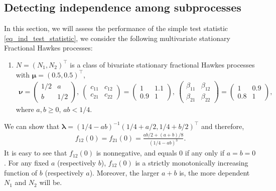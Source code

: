 \documentclass[11pt]{article}
\numberwithin{equation}{section}
\theoremstyle{plain}
\theoremstyle{definition}
\theoremstyle{definition}
\theoremstyle{assumption}
\theoremstyle{proposition}
\theoremstyle{proposition}
\theoremstyle{example}
\theoremstyle{lemma}
\theoremstyle{theorem}
\theoremstyle{remark}
\begin{document}
\subsection{Detecting independence among subprocesses}\label{example_estimation_nu}
In this section, we will assess the performance of the simple test statistic \eqref{eq_ind_test_statistic}, we consider the following multivariate stationary Fractional Hawkes processes:
\begin{enumerate}
 \item[FH6.] $N=(N_1,N_2)^{\top}$ is a class of bivariate stationary fractional Hawkes processes with $\boldsymbol{\mu} = (0.5, 0.5)^{\top}$,
 \begin{align*}
  \boldsymbol{\nu} = 
\begin{pmatrix}
1/2 & a \\
b & 1/2
\end{pmatrix} ,~
\begin{pmatrix}
c_{11} & c_{12} \\
c_{21} & c_{22}
\end{pmatrix} = 
\begin{pmatrix}
1 & 1.1 \\
0.9 & 1
\end{pmatrix} ,~
\begin{pmatrix}
\beta_{11} & \beta_{12} \\
\beta_{21} & \beta_{22}
\end{pmatrix} = 
\begin{pmatrix}
1 & 0.9 \\
0.8 & 1
\end{pmatrix} ,  
 \end{align*}
where $a,b\geqslant0$, $ab<1/4$. 
\end{enumerate}
We can show that $\boldsymbol{\lambda} = (1/4 - ab)^{-1}(1/4 + a/2, 1/4 + b/2)^{\top}$ and therefore,
\begin{align}\label{eq_f12(0)}
f_{12}(0) = f_{21}(0) = \frac{ab/2 + (a+b)/8}{(1/4 -ab)^3}.
\end{align}
It is easy to see that $f_{12}(0)$ is nonnegative, and  equals $0$ if any only if $a=b=0$. For any fixed $a$ (respectively $b$), $f_{12}(0)$ is a strictly monotonically increasing function of $b$ (respectively $a$). Moreover, the larger $a+b$ is, the more dependent $N_1$ and $N_2$ will be.
\end{document}
